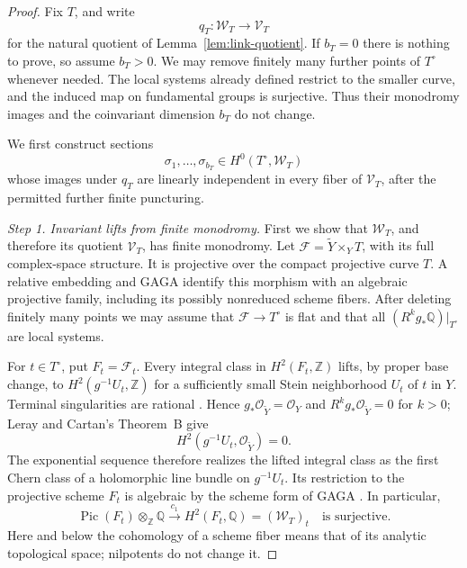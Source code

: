 \documentclass[11pt]{amsart}
\theoremstyle{definition}
\theoremstyle{remark}
\numberwithin{equation}{section}
\newcommand{\Q}{\mathbb{Q}}
\newcommand{\Z}{\mathbb{Z}}
\DeclareMathOperator{\Pic}{Pic}
\begin{document}
\begin{proof}
Fix \(T\), and write
\[
 q_T:\mathcal W_T\longrightarrow\mathcal V_T
\]
for the natural quotient of Lemma~\ref{lem:link-quotient}.  If \(b_T=0\)
there is nothing to prove, so assume \(b_T>0\).  We may remove finitely
many further points of \(T^\circ\) whenever needed.  The local systems
already defined restrict to the smaller curve, and the induced map on
fundamental groups is surjective.  Thus their monodromy images and the
coinvariant dimension \(b_T\) do not change.

We first construct sections
\[
 \sigma_1,\ldots,\sigma_{b_T}\in H^0(T^\circ,\mathcal W_T)
\]
whose images under \(q_T\) are linearly independent in every fiber of
\(\mathcal V_T\), after the permitted further finite puncturing.

\emph{Step 1. Invariant lifts from finite monodromy.}
First we show that \(\mathcal W_T\), and therefore its quotient
\(\mathcal V_T\), has finite monodromy.  Let
\(\mathcal F=\widetilde Y\times_Y T\), with its full complex-space
structure.  It is projective over the compact projective curve \(T\).
A relative embedding and GAGA identify this morphism with an algebraic
projective family, including its possibly nonreduced scheme fibers.
After deleting finitely many points we may assume that
\(\mathcal F\to T^\circ\) is flat and that all
\((R^kg_*\Q)|_{T^\circ}\) are local systems.

For \(t\in T^\circ\), put \(F_t=\mathcal F_t\).  Every integral class in
\(H^2(F_t,\Z)\) lifts, by proper base change, to
\(H^2(g^{-1}U_t,\Z)\) for a sufficiently small Stein neighborhood
\(U_t\) of \(t\) in \(Y\).  Terminal singularities are rational
\cite[Remark~3.8 and Theorem~3.12]{FujinoAnalyticMMP}.  Hence
\(g_*\mathcal O_{\widetilde Y}=\mathcal O_Y\) and
\(R^kg_*\mathcal O_{\widetilde Y}=0\) for \(k>0\); Leray and Cartan's
Theorem~B give
\[
 H^2(g^{-1}U_t,\mathcal O_{\widetilde Y})=0.
\]
The exponential sequence therefore realizes the lifted integral class
as the first Chern class of a holomorphic line bundle on \(g^{-1}U_t\).
Its restriction to the projective scheme \(F_t\) is algebraic by the
scheme form of GAGA
\cite[Corollary~4.3 and Theorem~4.4]{RaynaudSGA1XII}.  In particular,
\begin{equation}\label{eq:curve-fiber-chern}
 \Pic(F_t)\otimes_{\Z}\Q
 \xrightarrow{\ c_1\ } H^2(F_t,\Q)=(\mathcal W_T)_t
 \quad\text{is surjective}.
\end{equation}
Here and below the cohomology of a scheme fiber means that of its
analytic topological space; nilpotents do not change it.


\end{proof}
\end{document}
